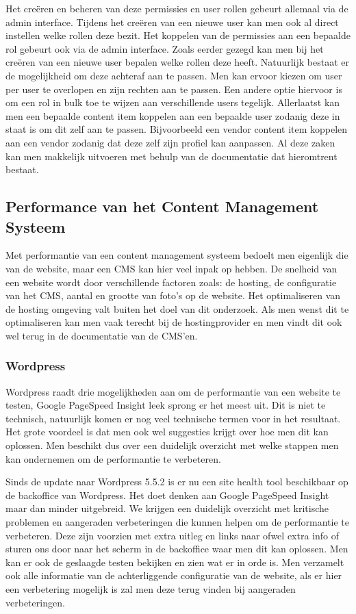 Het creëren en beheren van deze permissies en user rollen gebeurt allemaal via de admin interface. Tijdens het creëren van een nieuwe user kan men ook al direct instellen welke rollen deze bezit. Het koppelen van de permissies aan een bepaalde rol gebeurt ook via de admin interface. Zoals eerder gezegd kan men bij het creëren van een nieuwe user bepalen welke rollen deze heeft. Natuurlijk bestaat er de mogelijkheid om deze achteraf aan te passen. Men kan ervoor kiezen om user per user te overlopen en zijn rechten aan te passen. Een andere optie hiervoor is om een rol in bulk toe te wijzen aan verschillende users tegelijk. Allerlaatst kan men een bepaalde content item koppelen aan een bepaalde user zodanig deze in staat is om dit zelf aan te passen. Bijvoorbeeld een vendor content item koppelen aan een vendor  zodanig dat deze zelf zijn profiel kan aanpassen. Al deze zaken kan men makkelijk uitvoeren met behulp van de documentatie dat hieromtrent bestaat.

\subsection{Performance van het Content Management Systeem}
Met performantie van een content management systeem bedoelt men eigenlijk die van de website, maar een CMS kan hier veel inpak op hebben. De snelheid van een website wordt door verschillende factoren zoals: de hosting, de configuratie van het CMS, aantal en grootte van foto's op de website. Het optimaliseren van de hosting omgeving valt buiten het doel van dit onderzoek. Als men wenst dit te optimaliseren kan men vaak terecht bij de hostingprovider en men vindt dit ook wel terug in de documentatie van de CMS'en.

\subsubsection{Wordpress}
Wordpress raadt drie mogelijkheden aan om de performantie van een website te testen, Google PageSpeed Insight leek sprong er het meest uit. Dit is niet te technisch, natuurlijk komen er nog veel technische termen voor in het resultaat. Het grote voordeel is dat men ook wel suggesties krijgt over hoe men dit kan oplossen. Men beschikt dus over een duidelijk overzicht met welke stappen men kan ondernemen om de performantie te verbeteren.

Sinds de update naar Wordpress 5.5.2 is er nu een site health tool beschikbaar op de backoffice van Wordpress. Het doet denken aan Google PageSpeed Insight maar dan minder uitgebreid. We krijgen een duidelijk overzicht met kritische problemen en aangeraden verbeteringen die kunnen helpen om de performantie te verbeteren. Deze zijn voorzien met extra uitleg en links naar ofwel extra info of sturen ons door naar het scherm in de backoffice waar men dit kan oplossen. Men kan er ook de geslaagde testen bekijken en zien wat er in orde is. Men verzamelt ook alle informatie van de achterliggende configuratie van de website, als er hier een verbetering mogelijk is zal men deze terug vinden bij aangeraden verbeteringen.

